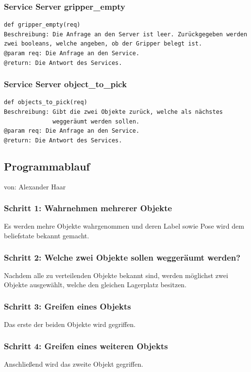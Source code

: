 \documentclass{suturo}
\makeatletter
\newcommand{\chapterauthor}[1]{%
  {\parindent0pt\vspace*{-27pt}%
  \linespread{0}\small\begin{flushright}von: #1\end{flushright}%
  \par\nobreak\vspace*{0pt}}
  \@afterheading%
}
\makeatother
\begin{document}
\subsubsection{Service Server gripper\_empty}
\begin{verbatim}
def gripper_empty(req)
Beschreibung: Die Anfrage an den Server ist leer. Zurückgegeben werden
zwei booleans, welche angeben, ob der Gripper belegt ist.
@param req: Die Anfrage an den Service.
@return: Die Antwort des Services.
\end{verbatim}

\subsubsection{Service Server object\_to\_pick}
\begin{verbatim}
def objects_to_pick(req)
Beschreibung: Gibt die zwei Objekte zurück, welche als nächstes 
              weggeräumt werden sollen.
@param req: Die Anfrage an den Service.
@return: Die Antwort des Services.
\end{verbatim}

\subsection*{Programmablauf}
\chapterauthor{Alexander Haar}
\subsubsection{Schritt 1: Wahrnehmen mehrerer Objekte}
Es werden mehre Objekte wahrgenommen und deren Label sowie Pose wird dem beliefstate bekannt gemacht.

\subsubsection{Schritt 2: Welche zwei Objekte sollen weggeräumt werden?}
Nachdem alle zu verteilenden Objekte bekannt sind, werden möglichst zwei Objekte ausgewählt, welche den gleichen Lagerplatz besitzen.

\subsubsection{Schritt 3: Greifen eines Objekts}
Das erste der beiden Objekte wird gegriffen.

\subsubsection{Schritt 4: Greifen eines weiteren Objekts}
Anschließend wird das zweite Objekt gegriffen.
\end{document}
